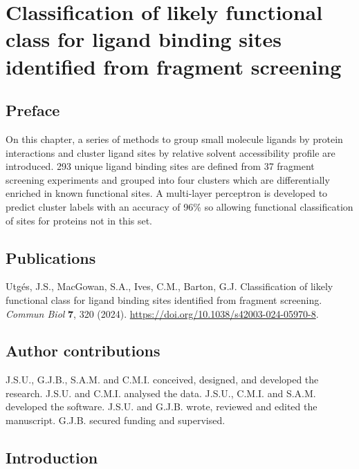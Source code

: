 \chapter{Classification of likely functional class for ligand binding sites identified from fragment screening}

\section*{Preface}

On this chapter, a series of methods to group small molecule ligands by protein interactions and cluster ligand sites by relative solvent accessibility profile are introduced. 293 unique ligand binding sites are defined from 37 fragment screening experiments and grouped into four clusters which are differentially enriched in known functional sites. A multi-layer perceptron is developed to predict cluster labels with an accuracy of 96\% so allowing functional classification of sites for proteins not in this set. 

\section*{Publications}

Utgés, J.S., MacGowan, S.A., Ives, C.M., Barton, G.J. Classification of likely functional class for ligand binding sites identified from fragment screening. \textit{Commun Biol} \textbf{7}, 320 (2024). \url{https://doi.org/10.1038/s42003-024-05970-8}.

\section*{Author contributions}

J.S.U., G.J.B., S.A.M. and C.M.I. conceived, designed, and developed the research. J.S.U. and C.M.I. analysed the data. J.S.U., C.M.I. and S.A.M. developed the software. J.S.U. and G.J.B. wrote, reviewed and edited the manuscript. G.J.B. secured funding and supervised.

\section{Introduction}

